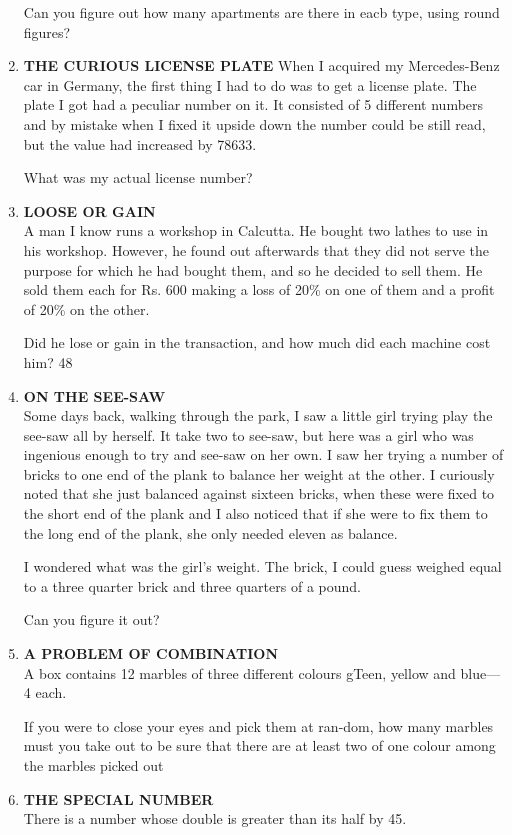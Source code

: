 \documentclass[12pt]{article}
\begin{document}
\begin{enumerate}
Can you  figure  out how  many  apartments  are there  in eacb type,  using  round  figures? 
%
\item \textbf{THE  CURIOUS  LICENSE  PLATE}
When  I acquired  my Mercedes-Benz  car in Germany,  the first thing  I had  to do was  to get a license  plate.  The plate  I got had a peculiar  number  on it. It consisted  of 5 different  numbers  and by mistake  when  I fixed  it upside down  the number  could  be still read,  but  the  value  had increased  by 78633. 

What  was  my actual  license  number? 
%
\item \textbf{LOOSE  OR GAIN} \\ 
A man  I know  runs  a workshop  in Calcutta.  He  bought two lathes  to use  in his workshop.  However,  he found out afterwards  that  they  did  not  serve  the purpose  for which  he had  bought  them,  and  so he decided  to sell them.  He  sold  them  each  for  Rs. 600 making  a loss of 20\%  on one  of them  and  a profit  of 20\%  on the other. 

Did he lose  or gain  in the transaction,  and  how  much did each  machine  cost  him? 
48 
%
\item \textbf{ON THE  SEE-SAW} \\
Some  days  back,  walking  through  the  park,  I saw  a little  girl  trying  play  the see-saw  all by herself.  It take two to see-saw,  but  here  was  a girl  who  was ingenious enough  to try and see-saw  on her own. I saw  her trying  a number  of bricks  to one end of the plank  to balance  her weight  at the other. I curiously  noted  that  she just balanced  against  sixteen bricks,  when  these  were  fixed  to the short  end of the plank and I also  noticed  that  if she were  to fix them  to the  long end of the plank,  she only  needed  eleven  as balance. 

I wondered  what  was  the  girl's  weight.  The  brick, I could  guess  weighed  equal  to a three  quarter  brick  and three  quarters  of a pound. 

Can you figure  it out? 
%
\item \textbf{A  PROBLEM  OF  COMBINATION} \\ 
A box  contains  12 marbles  of three  different  colours gTeen,  yellow  and blue—4  each. 

If you  were  to close  your  eyes  and pick  them  at ran-dom,  how  many  marbles  must  you  take  out to be sure that there  are  at least  two  of one  colour  among  the marbles  picked  out 
%
\item \textbf{THE  SPECIAL  NUMBER} \\ 
There  is a number  whose  double  is greater  than  its half by 45. 


\end{enumerate}
\end{document}
